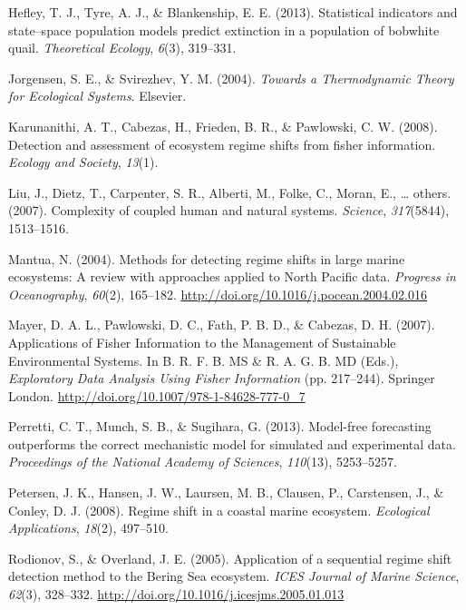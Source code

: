 \documentclass[12pt,twoside]{reedthesis}
\begin{document}
\leavevmode\hypertarget{ref-hefley2013statistical}{}%
Hefley, T. J., Tyre, A. J., \& Blankenship, E. E. (2013). Statistical indicators and state--space population models predict extinction in a population of bobwhite quail. \emph{Theoretical Ecology}, \emph{6}(3), 319--331.

\leavevmode\hypertarget{ref-jorgensen_towards_2004}{}%
Jorgensen, S. E., \& Svirezhev, Y. M. (2004). \emph{Towards a Thermodynamic Theory for Ecological Systems}. Elsevier.

\leavevmode\hypertarget{ref-karunanithi_detection_2008}{}%
Karunanithi, A. T., Cabezas, H., Frieden, B. R., \& Pawlowski, C. W. (2008). Detection and assessment of ecosystem regime shifts from fisher information. \emph{Ecology and Society}, \emph{13}(1).

\leavevmode\hypertarget{ref-liu_complexity_2007}{}%
Liu, J., Dietz, T., Carpenter, S. R., Alberti, M., Folke, C., Moran, E., \ldots{} others. (2007). Complexity of coupled human and natural systems. \emph{Science}, \emph{317}(5844), 1513--1516.

\leavevmode\hypertarget{ref-mantua_methods_2004}{}%
Mantua, N. (2004). Methods for detecting regime shifts in large marine ecosystems: A review with approaches applied to North Pacific data. \emph{Progress in Oceanography}, \emph{60}(2), 165--182. \url{http://doi.org/10.1016/j.pocean.2004.02.016}

\leavevmode\hypertarget{ref-mayer_applications_2007}{}%
Mayer, D. A. L., Pawlowski, D. C., Fath, P. B. D., \& Cabezas, D. H. (2007). Applications of Fisher Information to the Management of Sustainable Environmental Systems. In B. R. F. B. MS \& R. A. G. B. MD (Eds.), \emph{Exploratory Data Analysis Using Fisher Information} (pp. 217--244). Springer London. \url{http://doi.org/10.1007/978-1-84628-777-0_7}

\leavevmode\hypertarget{ref-perretti_model-free_2013}{}%
Perretti, C. T., Munch, S. B., \& Sugihara, G. (2013). Model-free forecasting outperforms the correct mechanistic model for simulated and experimental data. \emph{Proceedings of the National Academy of Sciences}, \emph{110}(13), 5253--5257.

\leavevmode\hypertarget{ref-petersen2008regime}{}%
Petersen, J. K., Hansen, J. W., Laursen, M. B., Clausen, P., Carstensen, J., \& Conley, D. J. (2008). Regime shift in a coastal marine ecosystem. \emph{Ecological Applications}, \emph{18}(2), 497--510.

\leavevmode\hypertarget{ref-rodionov_application_2005}{}%
Rodionov, S., \& Overland, J. E. (2005). Application of a sequential regime shift detection method to the Bering Sea ecosystem. \emph{ICES Journal of Marine Science}, \emph{62}(3), 328--332. \url{http://doi.org/10.1016/j.icesjms.2005.01.013}
\end{document}
